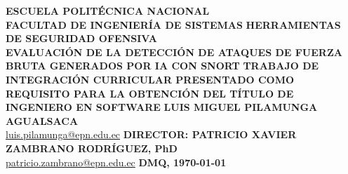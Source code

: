 \begin{titlepage}
\begin{center}
\textsf{\sizeveinticuatro\bfseries ESCUELA POLITÉCNICA NACIONAL}\\[1.5cm]
\textsf{\sizedieciseis\bfseries FACULTAD DE INGENIERÍA DE SISTEMAS}
\vfill
\textsf{\sizecatorce\bfseries HERRAMIENTAS DE SEGURIDAD OFENSIVA\\EVALUACIÓN DE LA DETECCIÓN DE ATAQUES DE FUERZA BRUTA GENERADOS POR IA CON SNORT}
\vfill
\textsf{\sizedoce\bfseries TRABAJO DE INTEGRACIÓN CURRICULAR PRESENTADO COMO REQUISITO PARA LA OBTENCIÓN DEL TÍTULO DE INGENIERO EN SOFTWARE}
\vfill
\textsf{\sizedoce\bfseries LUIS MIGUEL PILAMUNGA AGUALSACA}\\
\textsf{\sizedoce\href{mailto:luis.pilamunga@epn.edu.ec}{luis.pilamunga@epn.edu.ec}}
\vfill
\textsf{\sizedoce\bfseries DIRECTOR: PATRICIO XAVIER ZAMBRANO RODRÍGUEZ, PhD}\\
\textsf{\sizedoce\href{mailto:patricio.zambrano@epn.edu.ec}{patricio.zambrano@epn.edu.ec}}
\vfill
{\sizedoce\bfseries DMQ, \epnDate\today}
\end{center}
\end{titlepage}